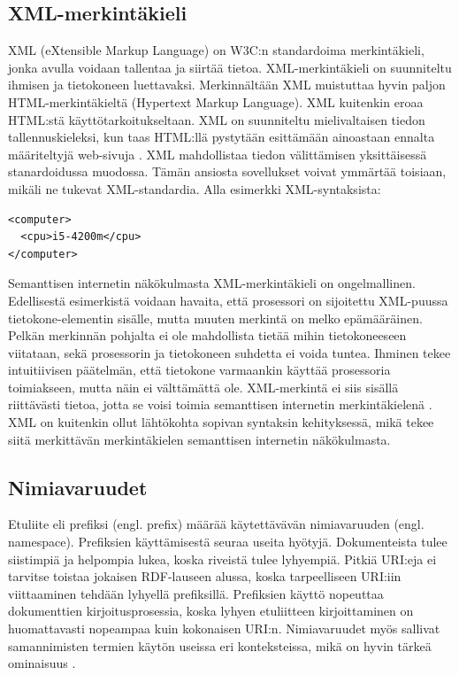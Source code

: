 \documentclass[finnish, 12pt, a4paper, elec, utf8, pdfa, online]{aaltothesis}
\begin{document}
\subsection{XML-merkintäkieli}
XML (eXtensible Markup Language) on W3C:n standardoima merkintäkieli, jonka avulla voidaan tallentaa ja siirtää tietoa. XML-merkintäkieli on suunniteltu ihmisen ja tietokoneen luettavaksi. Merkinnältään XML muistuttaa hyvin paljon HTML-merkintäkieltä (Hypertext Markup Language). XML kuitenkin eroaa HTML:stä käyttötarkoitukseltaan. XML on suunniteltu mielivaltaisen tiedon tallennuskieleksi, kun taas HTML:llä pystytään esittämään ainoastaan ennalta määriteltyjä web-sivuja \cite{IEEE_XML}. XML mahdollistaa tiedon välittämisen yksittäisessä stanardoidussa muodossa. Tämän ansiosta sovellukset voivat ymmärtää toisiaan, mikäli ne tukevat XML-standardia. Alla esimerkki XML-syntaksista:
\vspace{0.3cm}
\begin{lstlisting}[style=codeblock,caption={XML-syntaksiesimerkki.},captionpos=b,label={xml-esim}]
<computer>
  <cpu>i5-4200m</cpu>
</computer>
\end{lstlisting}

 Semanttisen internetin näkökulmasta XML-merkintäkieli on ongelmallinen. Edellisestä esimerkistä voidaan havaita, että prosessori on sijoitettu XML-puussa tietokone-elementin sisälle, mutta muuten merkintä on melko epämääräinen. Pelkän merkinnän pohjalta ei ole mahdollista tietää mihin tietokoneeseen viitataan, sekä prosessorin ja tietokoneen suhdetta ei voida tuntea. Ihminen tekee intuitiivisen päätelmän, että tietokone varmaankin käyttää prosessoria toimiakseen, mutta näin ei välttämättä ole. XML-merkintä ei siis sisällä riittävästi tietoa, jotta se voisi toimia semanttisen internetin merkintäkielenä \cite{IEEE_XML}. XML on kuitenkin ollut lähtökohta sopivan syntaksin kehityksessä, mikä tekee siitä merkittävän merkintäkielen semanttisen internetin näkökulmasta.

 \subsection{Nimiavaruudet}
 Etuliite eli prefiksi (engl. prefix) määrää käytettävävän nimiavaruuden (engl. namespace). Prefiksien käyttämisestä seuraa useita hyötyjä. Dokumenteista tulee siistimpiä ja helpompia lukea, koska riveistä tulee lyhyempiä. Pitkiä URI:eja ei tarvitse toistaa jokaisen RDF-lauseen alussa, koska tarpeelliseen URI:iin viittaaminen tehdään lyhyellä prefiksillä. Prefiksien käyttö nopeuttaa dokumenttien kirjoitusprosessia, koska lyhyen etuliitteen kirjoittaminen on huomattavasti nopeampaa kuin kokonaisen URI:n. Nimiavaruudet myös sallivat samannimisten termien käytön useissa eri konteksteissa, mikä on hyvin tärkeä ominaisuus \cite{Antoniou}.
\end{document}

